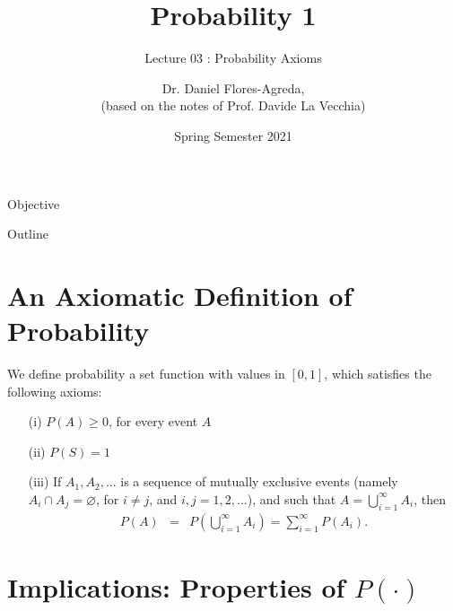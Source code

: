 \documentclass[notes=show,handout]{beamer}\usepackage[]{graphicx}\usepackage[]{color}
\newcommand{\bea}{\begin{eqnarray}}
\newcommand{\eea}{\end{eqnarray}}
\begin{document}
\title[S110015]{Probability 1}
\subtitle{Lecture 03 : Probability Axioms}
\author[Flores-Agreda, La Vecchia]{Dr. Daniel Flores-Agreda, \\[0.5em] \tiny{(based on the notes of Prof. Davide La Vecchia)}}
\date{Spring Semester 2021}

\begin{frame}
\titlepage
\end{frame}

\begin{frame}{Objective}
\end{frame}

\begin{frame}{Outline}
\tableofcontents
\end{frame}

\section{An Axiomatic Definition of Probability}
\begin{frame}{\secname}
  \begin{definition}
  We define probability a set function with values in $[0,1]$, which
  satisfies the following axioms:
  \begin{itemize}
  \item[ (i)] $P(A) \geq 0$, for every event $A$
  \item[ (ii)] $P(S)=1$
  \item[ (iii)] If $A_1,A_2,...$ is a sequence of mutually exclusive events (namely \color{red}$A_i \cap A_j =\varnothing$, for $i \neq j$, and $i,j=1,2,...$\color{black}),
  and such that
  $A = \bigcup_{i=1}^{\infty} A_i$, then
  \bea
  \label{Eq: additivity}
  P(A) &=& P\left(  \bigcup_{i=1}^\infty A_i \right) = \sum_{i=1}^{\infty} P(A_i).
  \eea
  \end{itemize}
  \end{definition}
\end{frame}

\section{Implications: Properties of $P(\cdot)$}
\end{document}
